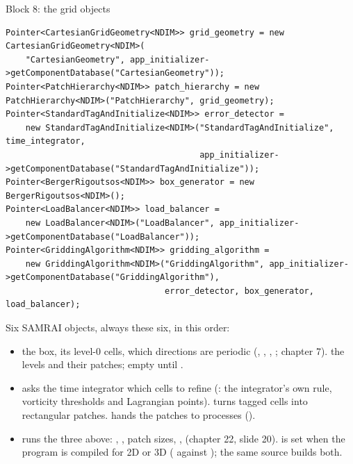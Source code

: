 \documentclass[aspectratio=169,11pt]{beamer}
\begin{document}
\begin{frame}[fragile]{Block 8: the grid objects}
\label{fr:grid}
\begin{lstlisting}[style=cpptiny]
Pointer<CartesianGridGeometry<NDIM>> grid_geometry = new CartesianGridGeometry<NDIM>(
    "CartesianGeometry", app_initializer->getComponentDatabase("CartesianGeometry"));
Pointer<PatchHierarchy<NDIM>> patch_hierarchy = new PatchHierarchy<NDIM>("PatchHierarchy", grid_geometry);
Pointer<StandardTagAndInitialize<NDIM>> error_detector =
    new StandardTagAndInitialize<NDIM>("StandardTagAndInitialize", time_integrator,
                                       app_initializer->getComponentDatabase("StandardTagAndInitialize"));
Pointer<BergerRigoutsos<NDIM>> box_generator = new BergerRigoutsos<NDIM>();
Pointer<LoadBalancer<NDIM>> load_balancer =
    new LoadBalancer<NDIM>("LoadBalancer", app_initializer->getComponentDatabase("LoadBalancer"));
Pointer<GriddingAlgorithm<NDIM>> gridding_algorithm =
    new GriddingAlgorithm<NDIM>("GriddingAlgorithm", app_initializer->getComponentDatabase("GriddingAlgorithm"),
                                error_detector, box_generator, load_balancer);
\end{lstlisting}
\scriptsize
Six SAMRAI objects, always these six, in this order:
\begin{itemize}
  \item {} the box, its level-0 cells, which directions are periodic (, , , ; chapter 7).  the levels and their patches; empty until .
  \item {} asks the time integrator which cells to refine (: the integrator's own rule, vorticity thresholds and Lagrangian points).  turns tagged cells into rectangular patches.  hands the patches to processes ().
  \item {} runs the three above: , , patch sizes, ,  (chapter 22, slide 20).  is set when the program is compiled for 2D or 3D ( against ); the same source builds both.
\end{itemize}
\end{frame}
\end{document}
